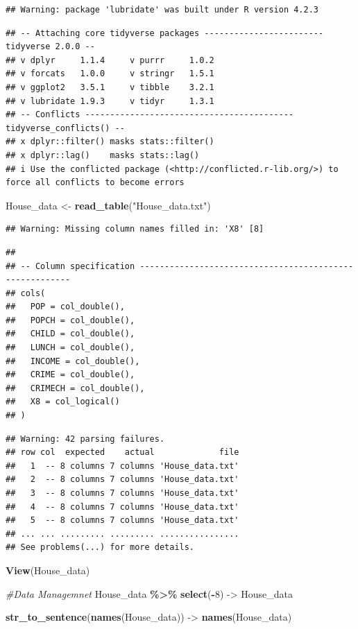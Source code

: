 \documentclass[
]{article}
\newenvironment{Shaded}{\begin{snugshade}}{\end{snugshade}}
\newcommand{\CommentTok}[1]{\textcolor[rgb]{0.56,0.35,0.01}{\textit{#1}}}
\newcommand{\DecValTok}[1]{\textcolor[rgb]{0.00,0.00,0.81}{#1}}
\newcommand{\FunctionTok}[1]{\textcolor[rgb]{0.13,0.29,0.53}{\textbf{#1}}}
\newcommand{\NormalTok}[1]{#1}
\newcommand{\OtherTok}[1]{\textcolor[rgb]{0.56,0.35,0.01}{#1}}
\newcommand{\SpecialCharTok}[1]{\textcolor[rgb]{0.81,0.36,0.00}{\textbf{#1}}}
\newcommand{\StringTok}[1]{\textcolor[rgb]{0.31,0.60,0.02}{#1}}
\begin{document}
\begin{verbatim}
## Warning: package 'lubridate' was built under R version 4.2.3
\end{verbatim}

\begin{verbatim}
## -- Attaching core tidyverse packages ------------------------ tidyverse 2.0.0 --
## v dplyr     1.1.4     v purrr     1.0.2
## v forcats   1.0.0     v stringr   1.5.1
## v ggplot2   3.5.1     v tibble    3.2.1
## v lubridate 1.9.3     v tidyr     1.3.1
## -- Conflicts ------------------------------------------ tidyverse_conflicts() --
## x dplyr::filter() masks stats::filter()
## x dplyr::lag()    masks stats::lag()
## i Use the conflicted package (<http://conflicted.r-lib.org/>) to force all conflicts to become errors
\end{verbatim}

\begin{Shaded}
\begin{Highlighting}[]
\NormalTok{House\_data }\OtherTok{\textless{}{-}} \FunctionTok{read\_table}\NormalTok{(}\StringTok{"House\_data.txt"}\NormalTok{)}
\end{Highlighting}
\end{Shaded}

\begin{verbatim}
## Warning: Missing column names filled in: 'X8' [8]
\end{verbatim}

\begin{verbatim}
## 
## -- Column specification --------------------------------------------------------
## cols(
##   POP = col_double(),
##   POPCH = col_double(),
##   CHILD = col_double(),
##   LUNCH = col_double(),
##   INCOME = col_double(),
##   CRIME = col_double(),
##   CRIMECH = col_double(),
##   X8 = col_logical()
## )
\end{verbatim}

\begin{verbatim}
## Warning: 42 parsing failures.
## row col  expected    actual             file
##   1  -- 8 columns 7 columns 'House_data.txt'
##   2  -- 8 columns 7 columns 'House_data.txt'
##   3  -- 8 columns 7 columns 'House_data.txt'
##   4  -- 8 columns 7 columns 'House_data.txt'
##   5  -- 8 columns 7 columns 'House_data.txt'
## ... ... ......... ......... ................
## See problems(...) for more details.
\end{verbatim}

\begin{Shaded}
\begin{Highlighting}[]
\FunctionTok{View}\NormalTok{(House\_data)}

\CommentTok{\#Data Managemnet}
\NormalTok{House\_data }\SpecialCharTok{\%\textgreater{}\%} 
  \FunctionTok{select}\NormalTok{(}\SpecialCharTok{{-}}\DecValTok{8}\NormalTok{) }\OtherTok{{-}\textgreater{}}\NormalTok{ House\_data}

\FunctionTok{str\_to\_sentence}\NormalTok{(}\FunctionTok{names}\NormalTok{(House\_data)) }\OtherTok{{-}\textgreater{}} \FunctionTok{names}\NormalTok{(House\_data)}
\end{Highlighting}
\end{Shaded}
\end{document}
